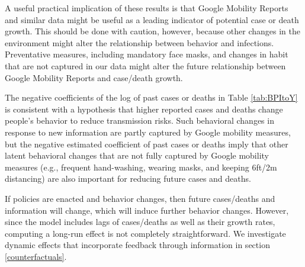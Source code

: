 \documentclass[11pt,reqno,letter]{amsart}
\theoremstyle{definition}
\renewcommand{\to}{{\rightarrow}}
\begin{document}
A useful practical implication of these results is that Google Mobility Reports and similar data might be useful as a leading indicator of potential case or death growth. This should be done with caution, however, because other changes in the environment might alter the relationship between behavior and infections. Preventative measures, including mandatory face masks, and changes in habit that are not captured in our data might alter the future relationship between Google Mobility Reports and case/death growth.

The negative coefficients of the log of past cases or deaths in
Table \ref{tab:BPItoY} is
consistent with a hypothesis that higher reported cases and deaths change people's behavior to reduce transmission risks. Such behavioral changes in response to new information   are  partly captured by Google mobility measures, but the negative estimated coefficient of past cases or deaths imply that other latent behavioral changes that are not fully captured by Google mobility measures (e.g., frequent hand-washing, wearing masks, and keeping 6ft/2m distancing) are also important for reducing future cases and deaths.

If policies are enacted and behavior changes, then future cases/deaths and information will change, which will induce further behavior changes.  However, since the model includes lags of cases/deaths as well as their growth rates,  computing a long-run effect is not completely straightforward. We investigate dynamic effects that incorporate feedback through information in section \ref{counterfactuals}.


%       
\end{document}
